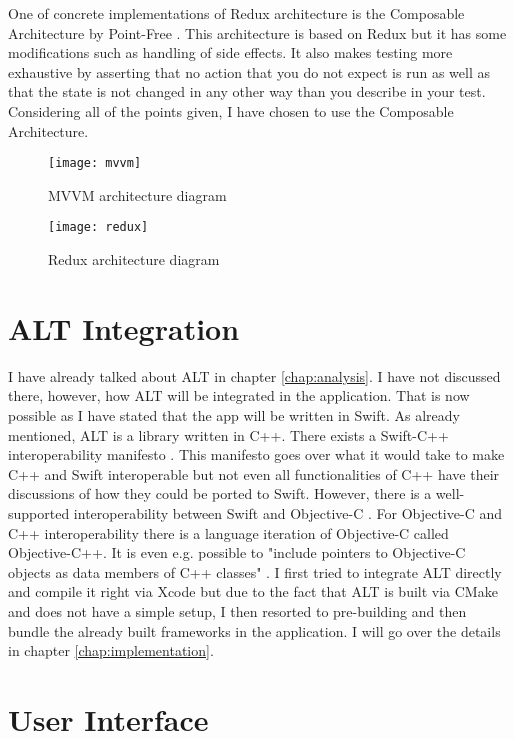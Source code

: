 One of concrete implementations of Redux architecture is the Composable Architecture by Point-Free \cite{tca}. This architecture is based on Redux but it has some modifications such as handling of side effects. It also makes testing more exhaustive by asserting that no action that you do not expect is run as well as that the state is not changed in any other way than you describe in your test. Considering all of the points given, I have chosen to use the Composable Architecture. 

\begin{figure}
    \texttt{[image: mvvm]}
    \caption{MVVM architecture diagram \cite{mvvm}}\label{mvvm}
\end{figure}

\begin{figure}
    \texttt{[image: redux]}
    \caption{Redux architecture diagram \cite{react-redux}}\label{redux}
\end{figure}

\section{ALT Integration}

I have already talked about ALT in chapter \ref{chap:analysis}. I have not discussed there, however, how ALT will be integrated in the application. That is now possible as I have stated that the app will be written in Swift. As already mentioned, ALT is a library written in C++. There exists a Swift-C++ interoperability manifesto \cite{swift-c++-manifesto}. This manifesto goes over what it would take to make C++ and Swift interoperable but not even all functionalities of C++ have their discussions of how they could be ported to Swift. However, there is a well-supported interoperability between Swift and Objective-C \cite{swift-objc-interoperability}. For Objective-C and C++ interoperability there is a language iteration of Objective-C called Objective-C++. It is even e.g. possible to "include pointers to Objective-C objects as data members of C++ classes" \cite{objc++}. I first tried to integrate ALT directly and compile it right via Xcode but due to the fact that ALT is built via CMake \cite{cmake} and does not have a simple setup, I then resorted to pre-building and then bundle the already built frameworks in the application. I will go over the details in chapter \ref{chap:implementation}.

\section{User Interface}

